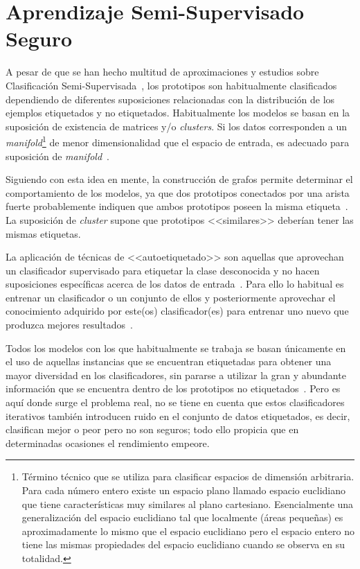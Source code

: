 \section{Aprendizaje Semi-Supervisado Seguro}
A pesar de que se han hecho multitud de aproximaciones y estudios sobre Clasificación Semi-Supervisada~\cite{jesper2020survey}, los prototipos son habitualmente clasificados dependiendo de diferentes suposiciones relacionadas con la distribución de los ejemplos etiquetados y no etiquetados. Habitualmente los modelos se basan en la suposición de existencia de matrices y/o \textit{clusters}. Si los datos corresponden a un \textit{manifold}\footnote{Término técnico que se utiliza para clasificar espacios de dimensión arbitraria. Para cada número entero existe un espacio plano llamado espacio euclidiano que tiene características muy similares al plano cartesiano. Esencialmente una generalización del espacio euclidiano tal que localmente (áreas pequeñas) es aproximadamente lo mismo que el espacio euclidiano pero el espacio entero no tiene las mismas propiedades del espacio euclidiano cuando se observa en su totalidad.} de menor dimensionalidad que el espacio de entrada, es adecuado para suposición de \textit{manifold}~\cite{wang2011solution}.

Siguiendo con esta idea en mente, la construcción de grafos permite determinar el comportamiento de los modelos, ya que dos prototipos conectados por una arista fuerte probablemente indiquen que ambos prototipos poseen la misma etiqueta~\cite{wang2013semi}. La suposición de \textit{cluster} supone que prototipos <<similares>> deberían tener las mismas etiquetas.

La aplicación de técnicas de <<autoetiquetado>> son aquellas que aprovechan un clasificador supervisado para etiquetar la clase desconocida y no hacen suposiciones específicas acerca de los datos de entrada~\cite{triguero2015self}. Para ello lo habitual es entrenar un clasificador o un conjunto de ellos y posteriormente aprovechar el conocimiento adquirido por este(os) clasificador(es) para entrenar uno nuevo que produzca mejores resultados~\cite{blum1998combining, zhou2005tri}.

Todos los modelos con los que habitualmente se trabaja se basan únicamente en el uso de aquellas instancias que se encuentran etiquetadas para obtener una mayor diversidad en los clasificadores, sin pararse a utilizar la gran y abundante información que se encuentra dentro de los prototipos no etiquetados~\cite{zhao2021safe}. Pero es aquí donde surge el problema real, no se tiene en cuenta que estos clasificadores iterativos también introducen ruido en el conjunto de datos etiquetados, es decir, clasifican mejor o peor pero no son seguros; todo ello propicia que en determinadas ocasiones el rendimiento empeore.

